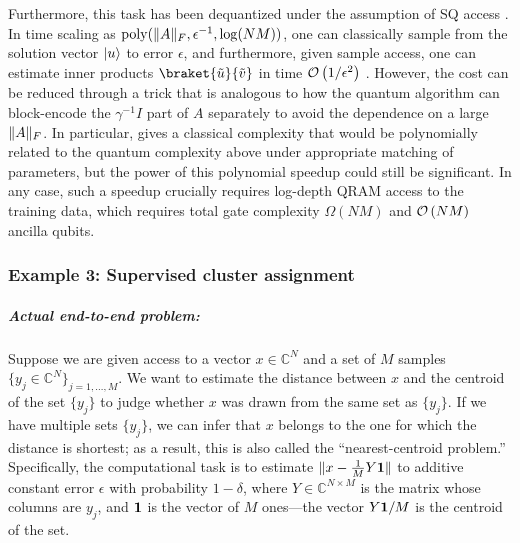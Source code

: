 \begin{refsection}
Furthermore, this task has been dequantized under the assumption of SQ access \cite{ding2019QInsSVM,chia2019SampdSubLinLowRankFramework,Shao2022FQILSS}. In time scaling as $\mathrm{poly}(\lVert A\rVert_F, \epsilon^{-1}, \log(NM))$, one can classically sample from the solution vector $\lvert u\rangle$ to error $\epsilon$, and furthermore, given sample access, one can estimate inner products $\braket{\tilde{u}}{\tilde{v}}$ in time $\mathcal{O}\left( 1/\epsilon^2 \right)$ \cite{tang2018QuantumInspiredRecommSys}. However, the cost can be reduced through a trick that is analogous to how the quantum algorithm can block-encode the $\gamma^{-1}I$ part of $A$ separately to avoid the dependence on a large $\lVert A\rVert_F$. In particular, \cite[Corollary 6.18]{chia2019SampdSubLinLowRankFramework} gives a classical complexity that would be polynomially related to the quantum complexity above under appropriate matching of parameters, but the power of this polynomial speedup could still be significant.
 In any case, such a speedup crucially requires log-depth QRAM access to the training data, which requires total gate complexity $\Omega(NM)$ and $\mathcal{O}\left( NM \right)$ ancilla qubits. 




\subsubsection*{Example 3: Supervised cluster assignment}


\subparagraph{Actual end-to-end problem:}
Suppose we are given access to a vector $x\in\mathbb{C}^N$ and a set of $M$ samples $\{y_j\in \mathbb{C}^N\}_{j=1,\ldots,M}$. We want to estimate the distance between $x$ and the centroid of the set $\{y_j\}$ to judge whether $x$ was drawn from the same set as $\{ y_j\}$. If we have multiple sets $\{y_j\}$, we can infer that $x$ belongs to the one for which the distance is shortest; as a result, this is also called the ``nearest-centroid problem.'' Specifically, the computational task is to estimate  $\lVert x-\frac{1}{M}Y \mathbf{1} \rVert$ to additive constant error $\epsilon$ with probability $1-\delta$, where $Y\in \mathbb{C}^{N\times M}$ is the matrix whose columns are $y_j$, and $\mathbf{1}$ is the vector of $M$ ones---the vector $Y\mathbf{1}/M$ is the centroid of the set. 



\end{refsection}
